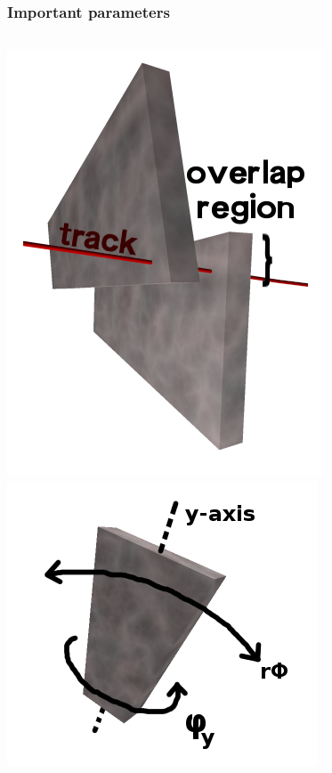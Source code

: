 \documentclass[compress]{beamer}
\begin{document}
\begin{frame}
\frametitle{Important parameters}
\small

\begin{columns}
\includegraphics[width=\linewidth]{overlaps.png}
\includegraphics[width=\linewidth]{one_chamber.png}

\end{columns}
\end{frame}
\end{document}
